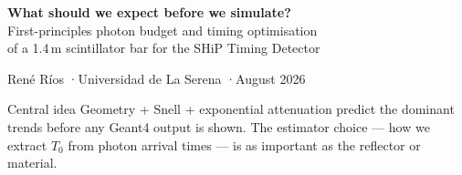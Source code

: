\documentclass[aspectratio=169,9pt]{beamer}
\begin{document}

\begin{frame}[plain]
  \vspace{1.0cm}
  \begin{center}
    {\Large\bfseries What should we expect before we simulate?}\\[5pt]
    {\small First-principles photon budget and timing optimisation\\
    of a 1.4\,m scintillator bar for the SHiP Timing Detector}
  \end{center}
  \vspace{0.5cm}
  \begin{center}
    René Ríos \quad·\quad Universidad de La Serena \quad·\quad August 2026
  \end{center}
  \vspace{0.4cm}
  \begin{block}{Central idea}
    {\small Geometry + Snell + exponential attenuation predict the dominant trends
    before any Geant4 output is shown.
    The estimator choice — how we extract $T_0$ from photon arrival times —
    is as important as the reflector or material.}
  \end{block}
\end{frame}
\end{document}
